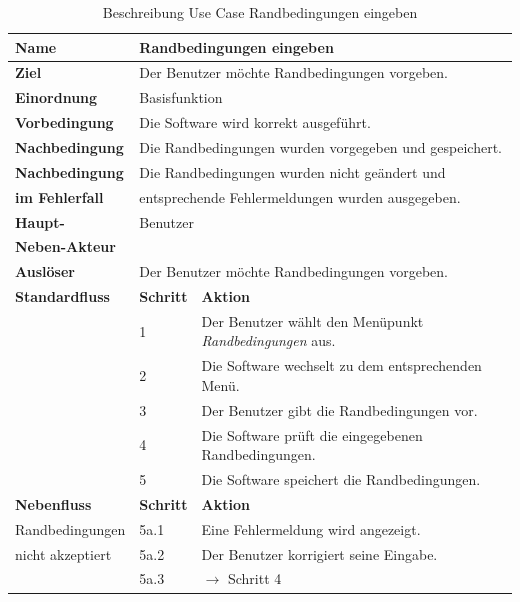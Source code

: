 \begin{table} [H]
	\centering
	\begin{tabular}{|l|l|l|}
		\hline
		\textbf{Name} 			& \multicolumn{2}{|l|}{Randbedingungen eingeben}  \\
		\hline
		\textbf{Ziel} 			& \multicolumn{2}{|l|}{Der Benutzer möchte Randbedingungen vorgeben. }\\ 
		\hline
		\textbf{Einordnung}		& \multicolumn{2}{|l|}{Basisfunktion}\\
		\hline
		\textbf{Vorbedingung}	& \multicolumn{2}{|l|}{Die Software wird korrekt ausgeführt.} \\
		\hline
		\textbf{Nachbedingung}	& \multicolumn{2}{|l|}{Die Randbedingungen wurden vorgegeben und gespeichert.}\\
		\hline
		\textbf{Nachbedingung} 	& \multicolumn{2}{|l|}{Die Randbedingungen wurden nicht geändert und}\\
		\textbf{im Fehlerfall}	& \multicolumn{2}{|l|}{entsprechende Fehlermeldungen wurden ausgegeben.}\\
		\hline
		\textbf{Haupt-} 		& \multicolumn{2}{|l|}{Benutzer}\\
		\textbf{Neben-Akteur}	& \multicolumn{2}{|l|}{	}			\\
		\hline
		\textbf{Auslöser} 		& \multicolumn{2}{|l|}{Der Benutzer möchte Randbedingungen vorgeben.} \\
		\hline 
		\textbf{Standardfluss} & \textbf{Schritt} & \textbf{Aktion} \\
		\hline
		&	1	& Der Benutzer wählt den Menüpunkt \emph{Randbedingungen} aus. \\
		\cline{2-3}
		&	2	& Die Software wechselt zu dem entsprechenden Menü.\\
		\cline{2-3}
		&	3	& Der Benutzer gibt die Randbedingungen vor.\\
		\cline{2-3}
		&	4	& Die Software prüft die eingegebenen Randbedingungen.\\
		\cline{2-3}
		&	5	& Die Software speichert die Randbedingungen.\\
		\hline
		\textbf{Nebenfluss} & \textbf{Schritt} & \textbf{Aktion}\\
		\hline
		Randbedingungen  & 5a.1 & Eine Fehlermeldung wird angezeigt.\\
		\cline{2-3}
		nicht akzeptiert 	& 5a.2	& Der Benutzer korrigiert seine Eingabe.\\
		\cline{2-3}
					& 5a.3 	& $\rightarrow$ Schritt 4\\
		\hline
	\end{tabular}
	\caption{Beschreibung Use Case Randbedingungen eingeben}
	\label{Beschreibung Use Case Randbedingungen eingeben}
\end{table}


